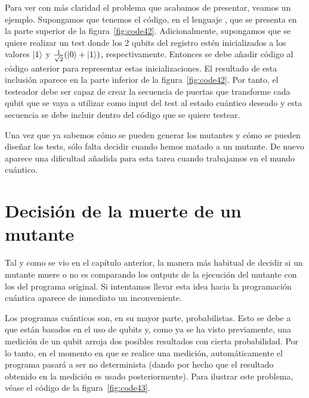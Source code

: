 Para ver con más claridad el problema que acabamos de presentar, veamos un ejemplo. Supongamos que tenemos el  código, en el lenguaje \qsh, que se presenta en la parte superior de la figura~\ref{fig:code42}.
%
Adicionalmente, supongamos que se quiere realizar un test donde los 2 qubits del registro estén inicializados a los valores $\left|1\right\rangle$ y $\tfrac{1}{\sqrt{2}}(\left|0\right\rangle+\left|1\right\rangle)$, respectivamente. Entonces se 
debe añadir código al código anterior para representar estas inicializaciones. El resultado de esta inclusión aparece en la parte inferior de la figura~\ref{fig:code42}.
%
Por tanto, el testeador debe ser capaz de crear la secuencia de puertas que transforme cada qubit que se vaya a utilizar como input del test al estado cuántico deseado y esta secuencia se debe incluir dentro del código que se quiere testear.

Una vez que ya sabemos cómo se pueden generar los mutantes y cómo se pueden diseñar los tests, sólo falta decidir cuando hemos matado a un mutante. De nuevo aparece una dificultad añadida para esta tarea cuando trabajamos en el mundo cuántico.

\section{Decisión de la muerte de un mutante}

Tal y como se vio en el capítulo anterior, la manera más habitual de decidir si un mutante muere o no es comparando los outputs de la ejecución del mutante con los del programa original. Si intentamos llevar esta idea hacia la programación cuántica aparece de inmediato un inconveniente.

Los programas cuánticos son, en su mayor parte, probabilistas. Esto se debe a que están basados en el uso de qubits y, como ya se ha visto previamente, una medición de un qubit arroja dos posibles resultados con cierta probabilidad. Por lo tanto, en el momento en que se realice una medición, automáticamente el programa pasará a ser no determinista (dando por hecho que el resultado  obtenido en la medición es usado posteriormente). Para ilustrar este problema, véase el código de la figura~\ref{fig:code43}.

